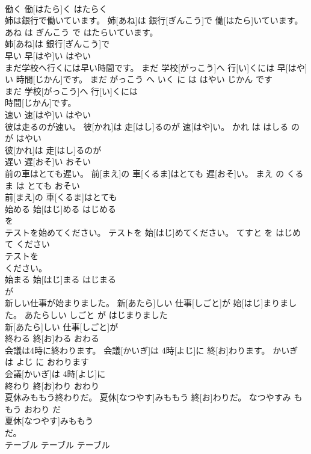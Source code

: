 \documentclass[8pt]{extreport}
\begin{document}
\begin{CJK}{UTF8}{min}
\\	働く	働[はたら]く	はたらく	
\\	姉は銀行で働いています。	姉[あね]は 銀行[ぎんこう]で 働[はたら]いています。	あね は ぎんこう で はたらいています。	
\\	姉[あね]は 銀行[ぎんこう]で
\\	早い	早[はや]い	はやい	
\\	まだ学校へ行くには早い時間です。	まだ 学校[がっこう]へ 行[い]くには 早[はや]い 時間[じかん]です。	まだ がっこう へ いく に は はやい じかん です	
\\	まだ 学校[がっこう]へ 行[い]くには
\\	時間[じかん]です。		
\\	速い	速[はや]い	はやい	
\\	彼は走るのが速い。	彼[かれ]は 走[はし]るのが 速[はや]い。	かれ は はしる の が はやい	
\\	彼[かれ]は 走[はし]るのが
\\	遅い	遅[おそ]い	おそい	
\\	前の車はとても遅い。	前[まえ]の 車[くるま]はとても 遅[おそ]い。	まえ の くるま は とても おそい	
\\	前[まえ]の 車[くるま]はとても
\\	始める	始[はじ]める	はじめる	
\\	を		
\\	テストを始めてください。	テストを 始[はじ]めてください。	てすと を はじめて ください	
\\	テストを
\\	ください。		
\\	始まる	始[はじ]まる	はじまる	
\\	が		
\\	新しい仕事が始まりました。	新[あたら]しい 仕事[しごと]が 始[はじ]まりました。	あたらしい しごと が はじまりました	
\\	新[あたら]しい 仕事[しごと]が
\\	終わる	終[お]わる	おわる	
\\	会議は4時に終わります。	会議[かいぎ]は 4時[よじ]に 終[お]わります。	かいぎ は よじ に おわります	
\\	会議[かいぎ]は 4時[よじ]に
\\	終わり	終[お]わり	おわり	
\\	夏休みももう終わりだ。	夏休[なつやす]みももう 終[お]わりだ。	なつやすみ も もう おわり だ	
\\	夏休[なつやす]みももう
\\	だ。		
\\	テーブル	テーブル	テーブル	

\end{CJK}
\end{document}

